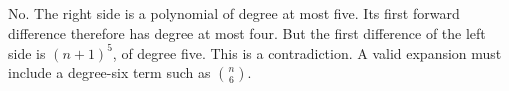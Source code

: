 No. The right side is a polynomial of degree at most five. Its first forward difference therefore has degree at most four. But the first difference of the left side is $(n+1)^5$, of degree five. This is a contradiction. A valid expansion must include a degree-six term such as $\binom n6$.
